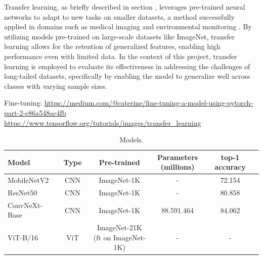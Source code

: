 Transfer learning, as briefly described in section , leverages pre-trained neural networks to adapt to new tasks on smaller datasets, a method successfully applied in domains such as medical imaging and environmental monitoring \cite{pan2010,Hinton2006,Fu2021}. By utilizing models pre-trained on large-scale datasets like ImageNet, transfer learning allows for the retention of generalized features, enabling high performance even with limited data. In the context of this project, transfer learning is employed to evaluate its effectiveness in addressing the challenges of long-tailed datasets, specifically by enabling the model to generalize well across classes with varying sample sizes.


Fine-tuning: 
\url{https://medium.com/@caterine/fine-tuning-a-model-using-pytorch-part-2-e86a548ac4fb}
\url{https://www.tensorflow.org/tutorials/images/transfer_learning}

\begin{table}[ht]
    \centering
    \caption{Models. }
    \scriptsize
    \begin{tabular}{lcccc}
    \toprule
    \textbf{Model} & \textbf{Type} & \textbf{Pre-trained} & \makecell{\textbf{Parameters} \\ \textbf{(millions)}} & \textbf{top-1 accuracy} \\
    \midrule
    MobileNetV2 \cite{sandler2018mobilenetv2} & CNN  & ImageNet-1K & - & 72.154 \cite{pytorch_mobilenetv2} \\
    ResNet50 \cite{he2015deepresiduallearningimage} & CNN & ImageNet-1K & - & 	
    80.858 \cite{torchvision-resnet} \\
    ConvNeXt-Base \cite{todi2023convnext}  & CNN & ImageNet-1K & 88.591.464 & 84.062 \cite{torchvision-convnext} \\
    ViT-B/16 \cite{dosovitskiy2021imageworth16x16words}   & ViT & \makecell{ImageNet-21K \\ (ft on ImageNet-1K)} & - & 	- \\
    \bottomrule
    \end{tabular}
    \label{tab:model_performance}
\end{table}


